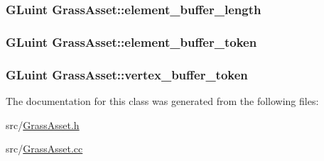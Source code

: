 \subsubsection[{element\+\_\+buffer\+\_\+length}]{\setlength{\rightskip}{0pt plus 5cm}G\+Luint Grass\+Asset\+::element\+\_\+buffer\+\_\+length\hspace{0.3cm}{\ttfamily [private]}}\label{classGrassAsset_a3bb3e3d9ac2d7806f0c8d2c04559e4c9}
\hypertarget{classGrassAsset_accd7a1c61ad5a5c29f9e8abf653e86a8}{}
\subsubsection[{element\+\_\+buffer\+\_\+token}]{\setlength{\rightskip}{0pt plus 5cm}G\+Luint Grass\+Asset\+::element\+\_\+buffer\+\_\+token\hspace{0.3cm}{\ttfamily [private]}}\label{classGrassAsset_accd7a1c61ad5a5c29f9e8abf653e86a8}
\hypertarget{classGrassAsset_a7b98229bcd980cddf4435518c254322e}{}
\subsubsection[{vertex\+\_\+buffer\+\_\+token}]{\setlength{\rightskip}{0pt plus 5cm}G\+Luint Grass\+Asset\+::vertex\+\_\+buffer\+\_\+token\hspace{0.3cm}{\ttfamily [private]}}\label{classGrassAsset_a7b98229bcd980cddf4435518c254322e}


The documentation for this class was generated from the following files\+:\begin{DoxyCompactItemize}
\item 
src/\hyperlink{GrassAsset_8h}{Grass\+Asset.\+h}\item 
src/\hyperlink{GrassAsset_8cc}{Grass\+Asset.\+cc}\end{DoxyCompactItemize}
